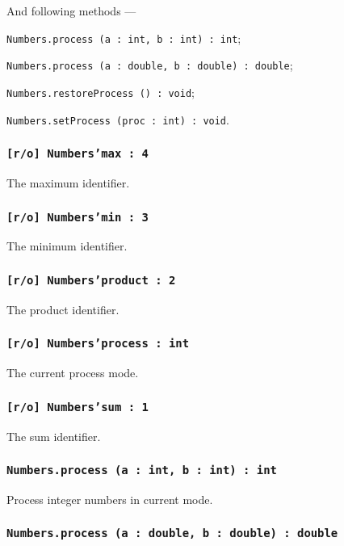And following methods —
\begin{icItems}
	\item \texttt{Numbers.process (a : int, b : int) : int};
	\item \texttt{Numbers.process (a : double, b : double) : double};
	\item \texttt{Numbers.restoreProcess () : void};
	\item \texttt{Numbers.setProcess (proc : int) : void}.
\end{icItems}

\subsubsection{\texttt{[r/o] Numbers'max : 4}}

The maximum identifier.

\subsubsection{\texttt{[r/o] Numbers'min : 3}}

The minimum identifier.

\subsubsection{\texttt{[r/o] Numbers'product : 2}}

The product identifier.

\subsubsection{\texttt{[r/o] Numbers'process : int}}

The current process mode.

\subsubsection{\texttt{[r/o] Numbers'sum : 1}}

The sum identifier.

\subsubsection{\texttt{Numbers.process (a : int, b : int) : int}}

Process integer numbers in current mode.

\subsubsection{\texttt{Numbers.process (a : double, b : double) : double}}


